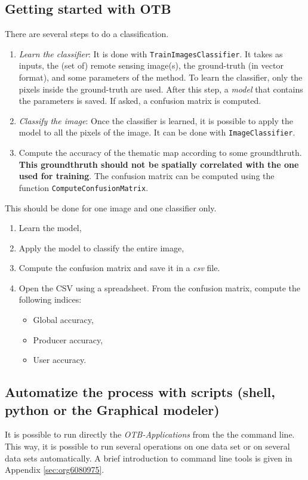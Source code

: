 \documentclass[a4paper,11pt,DIV=18]{scrartcl}
\begin{document}
\subsection{Getting started with OTB}
\label{sec:orgf4307bc}
There are several steps to do a classification.
\begin{enumerate}
\item \emph{Learn   the    classifier}:   It    is   done    with
\texttt{TrainImagesClassifier}.   It takes  as inputs,  the (set  of) remote
sensing  image(s), the  ground-truth (in  vector format),  and some
parameters of the method.  To learn the classifier, only the pixels
inside the  ground-truth are  used. After this  step, a  \emph{model} that
contains the parameters  is saved. If asked, a  confusion matrix is
computed.
\item \emph{Classify the image}: Once the  classifier is learned, it is possible
to apply the model to all the  pixels of the image.  It can be done
with \texttt{ImageClassifier}.
\item Compute the  accuracy of  the  thematic map  according to  some
groundthruth. \textbf{This groundthruth should  not be spatially correlated
with  the one  used  for  training}.  The  confusion  matrix can  be
computed using the function \texttt{ComputeConfusionMatrix}.
\end{enumerate}


\begin{work}
This should be done for one image and one classifier only.
\begin{enumerate}
\item Learn the model,
\item Apply the model to classify the entire image,
\item Compute the confusion matrix and save it in a \emph{csv} file.
\item Open  the CSV  using a spreadsheet.   From the  confusion matrix,
compute the following indices:
\begin{itemize}
\item Global accuracy,
\item Producer accuracy,
\item User accuracy.
\end{itemize}
\end{enumerate}
\end{work}

\subsection{Automatize the process with scripts (shell, python or the Graphical modeler)}
\label{sec:org0da6875}
It  is possible  to run  directly  the \emph{OTB-Applications}  from the  the
command line.  This way, it is  possible to run several  operations on
one  data  set  or  on  several  data  sets  automatically.   A  brief
introduction to command line tools is given in Appendix \ref{sec:org6080975}.
\end{document}
